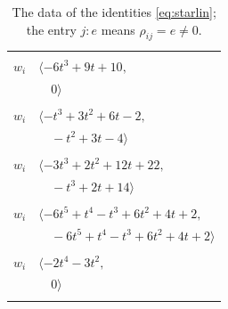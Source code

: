 \documentclass[11pt]{article}
\begin{document}
\begingroup\scriptsize
\setlength{\LTcapwidth}{\textwidth}
\begin{longtable}{@{}ll@{}}
\caption{The data of the identities \eqref{eq:starlin}; the entry $j{:}e$ means $\rho_{ij}=e\neq0$.}\label{tab:star}\\
\hline\endfirsthead\hline\endhead\hline\endfoot
\multicolumn{2}{@{}p{0.97\textwidth}@{}}{$i=0$, $D_i=1$, $\rho_{ij}$: $13{:}3, \allowbreak 27{:}3, \allowbreak 28{:}3, \allowbreak 31{:}2, \allowbreak 35{:}2, \allowbreak 37{:}3, \allowbreak 42{:}2$}\\
$w_i$ & $\langle -6t^{3}+9t+10,$\\
 & $\quad 0\rangle$\\
\addlinespace[2pt]
\multicolumn{2}{@{}p{0.97\textwidth}@{}}{$i=1$, $D_i=1$, $\rho_{ij}$: $10{:}2, \allowbreak 15{:}2, \allowbreak 16{:}2, \allowbreak 21{:}3, \allowbreak 22{:}1, \allowbreak 31{:}3, \allowbreak 33{:}3, \allowbreak 39{:}1$}\\
$w_i$ & $\langle -t^{3}+3t^{2}+6t-2,$\\
 & $\quad -t^{2}+3t-4\rangle$\\
\addlinespace[2pt]
\multicolumn{2}{@{}p{0.97\textwidth}@{}}{$i=2$, $D_i=1$, $\rho_{ij}$: $14{:}3, \allowbreak 20{:}2, \allowbreak 22{:}1, \allowbreak 27{:}3, \allowbreak 28{:}1, \allowbreak 30{:}2, \allowbreak 31{:}1, \allowbreak 32{:}1, \allowbreak 37{:}1$}\\
$w_i$ & $\langle -3t^{3}+2t^{2}+12t+22,$\\
 & $\quad -t^{3}+2t+14\rangle$\\
\addlinespace[2pt]
\multicolumn{2}{@{}p{0.97\textwidth}@{}}{$i=3$, $D_i=2$, $\rho_{ij}$: $5{:}3, \allowbreak 8{:}1, \allowbreak 9{:}1, \allowbreak 10{:}2, \allowbreak 12{:}1, \allowbreak 19{:}1, \allowbreak 23{:}1, \allowbreak 30{:}2, \allowbreak 33{:}1, \allowbreak 36{:}2, \allowbreak 37{:}1, \allowbreak 42{:}1$}\\
$w_i$ & $\langle -6t^{5}+t^{4}-t^{3}+6t^{2}+4t+2,$\\
 & $\quad -6t^{5}+t^{4}-t^{3}+6t^{2}+4t+2\rangle$\\
\addlinespace[2pt]
\multicolumn{2}{@{}p{0.97\textwidth}@{}}{$i=4$, $D_i=1$, $\rho_{ij}$: $5{:}1, \allowbreak 10{:}3, \allowbreak 12{:}3, \allowbreak 22{:}2, \allowbreak 24{:}3, \allowbreak 25{:}3$}\\
$w_i$ & $\langle -2t^{4}-3t^{2},$\\
 & $\quad 0\rangle$\\
\addlinespace[2pt]
\multicolumn{2}{@{}p{0.97\textwidth}@{}}{$i=5$, $D_i=12$, $e_i=2$, $\rho_{ij}$: $3{:}1, \allowbreak 4{:}3, \allowbreak 12{:}1, \allowbreak 20{:}3, \allowbreak 30{:}3, \allowbreak 39{:}1, \allowbreak 41{:}1$}\\

\end{longtable}
\end{document}
